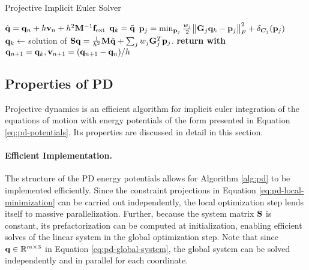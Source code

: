 \begin{algorithm}[h]
\caption{Projective Implicit Euler Solver}\label{alg:pd}
\begin{algorithmic}
\State $\tilde{\mathbf{q}} = \mathbf{q}_n + h\mathbf{v}_n + h^2\mathbf{M}^{-1}\mathbf{f}_{\text{ext}}$
\State $\mathbf{q}_k = \tilde{\mathbf{q}}$
\State $\mathbf{p}_j = \min_{\mathbf{p}_j} \frac{w_j}{2}\norm{\mathbf{G}_j\mathbf{q}_k - \mathbf{p}_j}^2_F + \delta_{\bm{C}_j}(\mathbf{p}_j)$
\EndFor
\State $\mathbf{q}_{k} \gets$ solution of $\mathbf{S}\mathbf{q} = \frac{1}{h^2}\mathbf{M}\tilde{\mathbf{q}} + \sum_j w_j \mathbf{G}_j^T \mathbf{p}_j$.
\EndFor
\State \textbf{return with } $\mathbf{q}_{n+1} = \mathbf{q}_k, \mathbf{v}_{n+1} = (\mathbf{q}_{n+1} - \mathbf{q}_n) / h$
\EndProcedure
\end{algorithmic}
\end{algorithm}

\subsection{Properties of PD}\label{ss:pd-properties}
Projective dynamics is an efficient algorithm for implicit euler integration of the equations of motion with energy potentials of the form 
presented in Equation \ref{eq:pd-potentials}. Its properties are discussed in detail in this section.

\paragraph{Efficient Implementation.}
The structure of the PD energy potentials allows for Algorithm \ref{alg:pd} to be implemented efficiently. Since the constraint projections
in Equation \ref{eq:pd-local-minimization} can be carried out independently, the local optimization step lends itself to massive parallelization. 
Further, because the system matrix $\mathbf{S}$ is constant, its prefactorization can be computed at initialization, enabling
efficient solves of the linear system in the global optimization step. Note that since $\mathbf{q} \in \mathbb{R}^{m \times 3}$ in Equation \ref{eq:pd-global-system}, 
the global system can be solved independently and in parallel for each coordinate.

